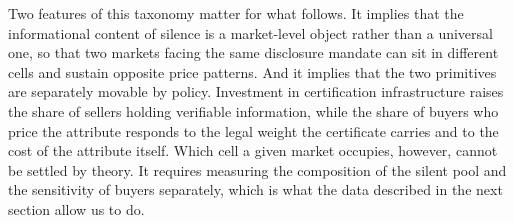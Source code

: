 Two features of this taxonomy matter for what follows. It implies that the informational content
of silence is a market-level object rather than a universal one, so that two markets facing the
same disclosure mandate can sit in different cells and sustain opposite price patterns. And it
implies that the two primitives are separately movable by policy. Investment in certification
infrastructure raises the share of sellers holding verifiable information, while the
share of buyers who price the attribute responds to the legal weight the certificate carries and
to the cost of the attribute itself. Which cell a given market occupies, however, cannot be
settled by theory. It requires measuring the composition of the silent pool and the sensitivity
of buyers separately, which is what the data described in the next section allow us to do.
